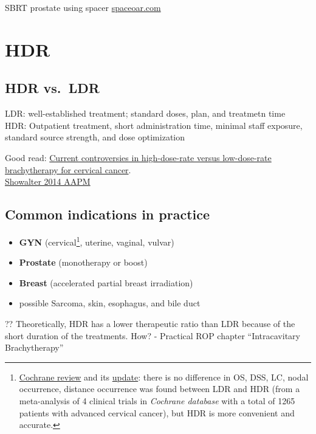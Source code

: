 \documentclass[]{book}
\providecommand{\tightlist}{%
  \setlength{\itemsep}{0pt}\setlength{\parskip}{0pt}}
\let\rmarkdownfootnote\footnote%
\def\footnote{\protect\rmarkdownfootnote}
\theoremstyle{definition}
\theoremstyle{definition}
\theoremstyle{definition}
\theoremstyle{remark}
\begin{document}
SBRT prostate using spacer
\href{https://www.spaceoar.com/physicians/clinical-publications/}{spaceoar.com}

\chapter{HDR}\label{hdr}

\section{HDR vs.~LDR}\label{hdr-vs.ldr}

LDR: well-established treatment; standard doses, plan, and treatmetn
time\\
HDR: Outpatient treatment, short administration time, minimal staff
exposure, standard source strength, and dose optimization

Good read: \href{https://www.ncbi.nlm.nih.gov/pubmed/16874815}{Current
controversies in high-dose-rate versus low-dose-rate brachytherapy for
cervical cancer}.\\
\href{https://www.aapm.org/education/vl/vl.asp?id=3911\%5D}{Showalter
2014 AAPM}

\section{Common indications in
practice}\label{common-indications-in-practice}

\begin{itemize}
\tightlist
\item
  \textbf{GYN} (cervical\footnote{\href{http://cochranelibrary-wiley.com/doi/10.1002/14651858.CD007563.pub2/abstract}{Cochrane
    review} and its
    \href{https://www.ncbi.nlm.nih.gov/m/pubmed/25300170/?i=5\&from=/10432431/related}{update}:
    there is no difference in OS, DSS, LC, nodal occurrence, distance
    occurrence was found between LDR and HDR (from a meta-analysis of 4
    clinical trials in \emph{Cochrane database} with a total of 1265
    patients with advanced cervical cancer), but HDR is more convenient
    and accurate.}, uterine, vaginal, vulvar)
\item
  \textbf{Prostate} (monotherapy or boost)
\item
  \textbf{Breast} (accelerated partial breast irradiation)
\item
  possible Sarcoma, skin, esophagus, and bile duct
\end{itemize}

?? Theoretically, HDR has a lower therapeutic ratio than LDR because of
the short duration of the treatments. How? - Practical ROP chapter
``Intracavitary Brachytherapy''
\end{document}
